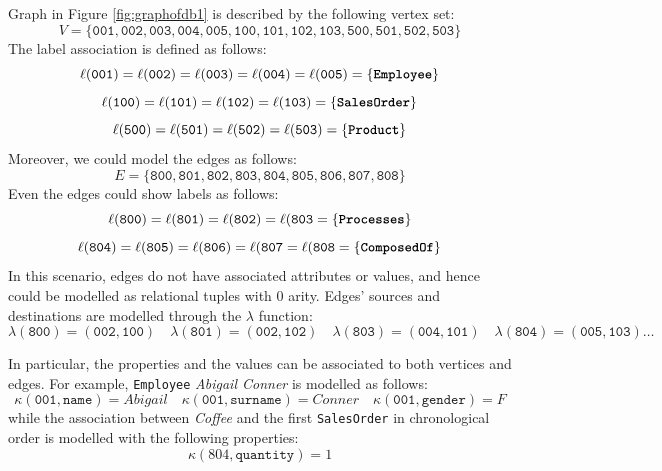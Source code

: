 \begin{example}
Graph in Figure \ref{fig:graphofdb1} is described by the following vertex set:
\[V=\{\texttt{001},\texttt{002},\texttt{003},\texttt{004},\texttt{005},\texttt{100},\texttt{101},\texttt{102},\texttt{103},\texttt{500},\texttt{501},\texttt{502},\texttt{503}\}\]
The label association is defined as follows:
\[\ell(\texttt{001})=\ell(\texttt{002})=\ell(\texttt{003})=\ell(\texttt{004})=\ell(\texttt{005})=\{\texttt{\textbf{Employee}}\}\]
\[\ell(\texttt{100})=\ell(\texttt{101})=\ell(\texttt{102})=\ell(\texttt{103})=\{\texttt{\textbf{SalesOrder}}\}\]
\[\ell(\texttt{500})=\ell(\texttt{501})=\ell(\texttt{502})=\ell(\texttt{503})=\{\texttt{\textbf{Product}}\}\]
Moreover, we could model the edges as follows:
\[E=\{\texttt{800},\texttt{801},\texttt{802},\texttt{803},\texttt{804},\texttt{805},\texttt{806},\texttt{807},\texttt{808}\}\]
Even the edges could show labels as follows:
\[\ell(\texttt{800})=\ell(\texttt{801})=\ell(\texttt{802})=\ell(\texttt{803}=\{\textbf{\texttt{Processes}}\}\]
\[\ell(\texttt{804})=\ell(\texttt{805})=\ell(\texttt{806})=\ell(\texttt{807}=\ell(\texttt{808}=\{\textbf{\texttt{ComposedOf}}\}\]
In this scenario, edges do not have associated attributes or values, and hence could be modelled as relational tuples with $0$ arity. Edges' sources and destinations are modelled through the $\lambda$ function:
\[\lambda(\texttt{800})=(\texttt{002},\texttt{100})\quad \lambda(\texttt{801})=(\texttt{002},\texttt{102})\quad \lambda(\texttt{803})=(\texttt{004},\texttt{101})\quad \lambda(\texttt{804})=(\texttt{005},\texttt{103})\dots\]

In particular, the properties and the values can be associated to both vertices and edges. For example,  \texttt{Employee} \textit{Abigail Conner} is modelled as follows:
\[\kappa(\texttt{001},\texttt{name})=\textit{Abigail}\quad \kappa(\texttt{001},\texttt{surname})=\textit{Conner}\quad \kappa(\texttt{001},\texttt{gender})=\textit{F}\] 
while the association between \textit{Coffee} and the first \texttt{SalesOrder} in chronological order is modelled with the following properties:
\[\kappa(804,\texttt{quantity})=1\]

\end{example}


